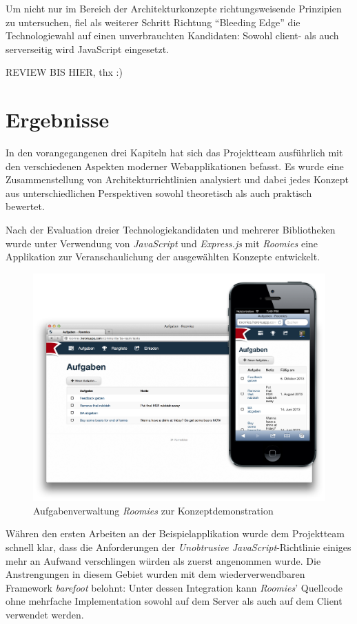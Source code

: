 Um nicht nur im Bereich der Architekturkonzepte richtungsweisende Prinzipien zu untersuchen, fiel als weiterer Schritt Richtung ``Bleeding Edge'' die Technologiewahl auf einen unverbrauchten Kandidaten: Sowohl client- als auch serverseitig wird JavaScript eingesetzt.

REVIEW BIS HIER, thx :)




\section{Ergebnisse}

In den vorangegangenen drei Kapiteln hat sich das Projektteam ausführlich mit den verschiedenen Aspekten moderner Webapplikationen befasst. Es wurde eine Zusammenstellung von Architekturrichtlinien analysiert und dabei jedes Konzept aus unterschiedlichen Perspektiven sowohl theoretisch als auch praktisch bewertet.

Nach der Evaluation dreier Technologiekandidaten und mehrerer Bibliotheken wurde unter Verwendung von \emph{JavaScript} und \emph{Express.js} mit \emph{Roomies} eine Applikation zur Veranschaulichung der ausgewählten Konzepte entwickelt.

\begin{figure}[H]
	\centering
	\includegraphics[width=12cm]{content/principle-demonstration/images/responsive-screenshots.png}
	\caption{Aufgabenverwaltung \emph{Roomies} zur Konzeptdemonstration}
\end{figure}

Währen den ersten Arbeiten an der Beispielapplikation wurde dem Projektteam schnell klar, dass die Anforderungen der \emph{Unobtrusive JavaScript}-Richtlinie einiges mehr an Aufwand verschlingen würden als zuerst angenommen wurde. Die Anstrengungen in diesem Gebiet wurden mit dem wiederverwendbaren Framework \emph{barefoot} belohnt: Unter dessen Integration kann \emph{Roomies}' Quellcode ohne mehrfache Implementation sowohl auf dem Server als auch auf dem Client verwendet werden.






